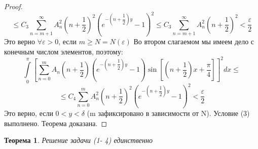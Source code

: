 \documentclass[a4paper, 9pt]{article}
\newtheorem{theorem}{Теорема}
\begin{document}
\begin{proof}
\begin{equation*}
	\end{equation*}
	\begin{equation*}
		\leq  C_3 \sum\limits_{n=m+1}^{\infty} A_n^2 \left(n+\dfrac12\right)^2 \left(e^{-\left(n+\dfrac12\right)y} - 1\right)^2 \leq C_3 \sum\limits_{n=m+1}^{\infty} A_n^2 \left(n+\dfrac12\right)^2 < \dfrac{\varepsilon}{2}
	\end{equation*}
	Это верно $\forall \varepsilon > 0$, если $m \geq N =N(\varepsilon)$\newline
	Во втором слагаемом мы имеем дело с конечным числом элементов, поэтому:
	\begin{equation*}
		\int\limits_0^\pi \left[	\sum\limits_{n=0}^{m} A_n\left(n+\dfrac12\right) \left( e^{-\left(n+\dfrac12\right)y} - 1\right) \sin{\left[\left(n+\dfrac12\right) x  + \dfrac\pi4\right]} \right]^2 dx \leq
	\end{equation*}
	\begin{equation*}
		\leq C_4 \sum\limits_{n=0}^{m} A_n^2 \left(n +\dfrac12\right)^2 \left(e^{-\left(n+\dfrac12\right)y} - 1\right)^2 < \dfrac{\varepsilon}{2}
	\end{equation*}
	Это верно, если $0 < y < \delta$ (m зафиксировано в зависимости от N). Условие (3) выполнено. Теорема доказана.
	\end{proof}
	\begin{theorem}
		Решение задачи (1- 4) единственно
	\end{theorem}
\end{document}
